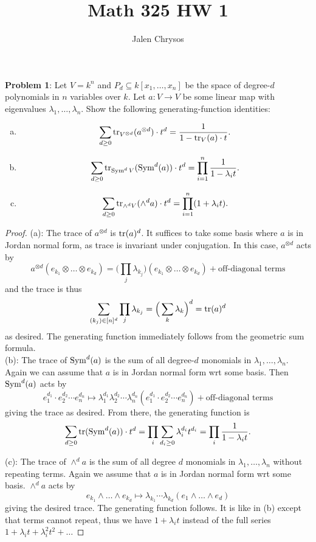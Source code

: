 \documentclass{amsart}
\title{Math 325 HW 1}
\author{Jalen Chrysos}
\begin{document}
	
	\maketitle
	
\noindent \textbf{Problem 1}:  Let $V=k^n$ and $P_d\subseteq k[x_1,\dots,x_n]$ be the space of degree-$d$ polynomials in $n$ variables over $k$. Let $a:V\to V$ be some linear map with eigenvalues $\lambda_1,\dots,\lambda_n$. Show the following generating-function identities:
\begin{enumerate}[(a)]
	\item $$\sum_{d\geq 0} \operatorname{tr}_{V^{\otimes d}}(a^{\otimes d})\cdot t^d = \frac{1}{1-\operatorname{tr}_V(a)\cdot t}.$$
	\item $$\sum_{d\geq 0} \operatorname{tr}_{\operatorname{Sym}^dV}(\operatorname{Sym}^d(a)) \cdot t^d = \prod_{i=1}^n \frac{1}{1-\lambda_it}.$$
	\item $$\sum_{d\geq 0} \operatorname{tr}_{\wedge^dV}(\wedge^d a)\cdot t^d = \prod_{i=1}^n (1+\lambda_i t).$$
\end{enumerate}
	\begin{proof}
		(a): The trace of $a^{\otimes d}$ is $\operatorname{tr}(a)^d$. It suffices to take some basis where $a$ is in Jordan normal form, as trace is invariant under conjugation. In this case, $a^{\otimes d}$ acts by
		$$a^{\otimes d}(e_{k_1}\otimes \dots \otimes e_{k_d}) = \Big(\prod_j \lambda_{k_j}\Big) (e_{k_1}\otimes \dots \otimes e_{k_d}) + \text{off-diagonal terms}$$
		and the trace is thus
		$$
		\sum_{(k_j)\in [n]^d} \prod_j \lambda_{k_j} = \Big(\sum_k \lambda_k\Big)^d = \operatorname{tr}(a)^d
		$$
		as desired. The generating function immediately follows from the geometric sum formula.\\
		
		(b): The trace of $\operatorname{Sym}^d(a)$ is the sum of all degree-$d$ monomials in $\lambda_1,\dots,\lambda_n$. Again we can assume that $a$ is in Jordan normal form wrt some basis. Then $\operatorname{Sym}^d(a)$ acts by
		$$
		e_1^{d_1}\cdot e_2^{d_2}\cdots e_n^{d_n} \mapsto \lambda_1^{d_1}\lambda_2^{d_2}\cdots \lambda_n^{d_n} (e_1^{d_1}\cdot e_2^{d_2}\cdots e_n^{d_n}) + \text{off-diagonal terms}
		$$
		giving the trace as desired. From there, the generating function is
		$$
		\sum_{d\geq 0} \operatorname{tr}(\operatorname{Sym}^d(a))\cdot t^d = \prod_i \sum_{d_i \geq 0} \lambda_i^{d_i} t^{d_i} = \prod_i \frac{1}{1-\lambda_i t}.
		$$
		
		(c): The trace of $\wedge^d a$ is the sum of all degree $d$ monomials in $\lambda_1,\dots,\lambda_n$ without repeating terms. Again we assume that $a$ is in Jordan normal form wrt some basis. $\wedge^d a$ acts by
		$$
		e_{k_1}\wedge \dots \wedge e_{k_d} \mapsto \lambda_{k_1}\cdots\lambda_{k_d} (e_1\wedge \dots \wedge e_d)
		$$
		giving the desired trace. The generating function follows. It is like in (b) except that terms cannot repeat, thus we have $1+\lambda_i t$ instead of the full series $1+\lambda_it+\lambda_i^2t^2+\dots$
	\end{proof}
	
\end{document}
